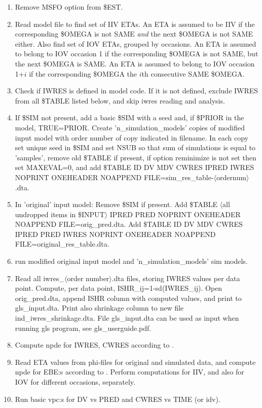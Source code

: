 \begin{enumerate}
\item Remove MSFO option from \$EST.
\item Read model file to find set of IIV ETAs. An ETA is assumed to be IIV if the
corresponding \$OMEGA is not SAME
\emph{and} the next \$OMEGA is not SAME either. Also find set of IOV ETAs, grouped by occasions.
An ETA is assumed to belong to IOV occasion 1 if the corresponding \$OMEGA is not SAME,
but the next \$OMEGA is SAME. 
An ETA is assumed to belong to IOV occasion 1+$i$ if the corresponding \$OMEGA the $i$th consecutive SAME \$OMEGA.
\item Check if IWRES is defined in model code. If it is not defined, exclude
IWRES from all \$TABLE listed below, and skip iwres reading and analysis.
\item If \$SIM not present, add a basic \$SIM with a seed and, if \$PRIOR in the model, TRUE=PRIOR.
Create 'n\_simulation\_models' copies of modified
input model with order number of copy indicated in filename. In each copy set unique
seed in \$SIM and set
NSUB so that sum of simulations is equal to 'samples', remove old \$TABLE if present, 
if option reminimize is not set then set MAXEVAL=0, and
add \$TABLE ID DV MDV CWRES IPRED IWRES NOPRINT ONEHEADER NOAPPEND FILE=sim\_res\_table-$\langle$ordernum$\rangle$.dta. 
\item In 'original' input model:
Remove \$SIM if present.
Add \$TABLE $\langle$all undropped items in
\$INPUT$\rangle$ IPRED PRED NOPRINT ONEHEADER NOAPPEND FILE=orig\_pred.dta.
Add \$TABLE ID DV MDV CWRES IPRED PRED IWRES NOPRINT ONEHEADER NOAPPEND FILE=original\_res\_table.dta. 
\item run modified original input model and 'n\_simulation\_models' sim models.
\item Read all iwres\_$\langle$order number$\rangle$.dta files,
storing IWRES values per data point. Compute, per data point, ISHR\_ij=1-sd(IWRES\_ij).
Open orig\_pred.dta, append ISHR column with
computed values,
and print to gls\_input.dta. Print also shrinkage column to new file ind\_iwres\_shrinkage.dta. File gls\_input.dta
can be used as input when running gls program, see gls\_userguide.pdf. 
\item Compute npde for IWRES, CWRES according to \cite{Comets}.
\item Read ETA values from 
phi-files for original and simulated data, and compute npde for EBE:s according to \cite{Comets}.
Perform computations for IIV, and also for IOV for different occasions, separately. 
\item Run basic vpc:s for DV vs PRED and CWRES vs TIME (or idv).
\end{enumerate}


